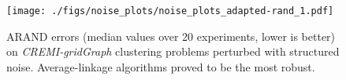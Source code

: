 

\begin{figure}[b]
\centering
\texttt{[image: ./figs/noise\_plots/noise\_plots\_adapted-rand\_1.pdf]}
        \caption{
ARAND errors (median values over 20 experiments, lower is better) on \emph{CREMI-gridGraph} clustering problems perturbed with structured noise. Average-linkage algorithms proved to be the most robust.
}\label{fig:scores_structured_noise}
\end{figure}


